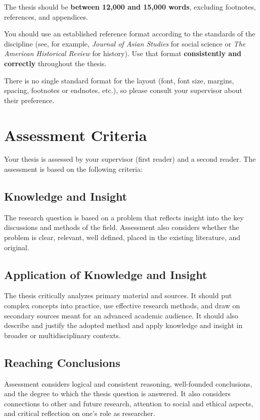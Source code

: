 \documentclass[11pt,a4paper]{article}
\begin{document}
The thesis should be \textbf{between 12,000 and 15,000 words}, excluding footnotes, references, and appendices.

You should use an established reference format according to the standards of the discipline (see, for example, \textit{Journal of Asian Studies} for social science or \textit{The American Historical Review} for history). Use that format \textbf{consistently and correctly} throughout the thesis.

There is no single standard format for the layout (font, font size, margins, spacing, footnotes or endnotes, etc.), so please consult your supervisor about their preference.

\section{Assessment Criteria}

Your thesis is assessed by your supervisor (first reader) and a second reader. The assessment is based on the following criteria:

\subsection{Knowledge and Insight}

The research question is based on a problem that reflects insight into the key discussions and methods of the field. Assessment also considers whether the problem is clear, relevant, well defined, placed in the existing literature, and original.

\subsection{Application of Knowledge and Insight}

The thesis critically analyzes primary material and sources. It should put complex concepts into practice, use effective research methods, and draw on secondary sources meant for an advanced academic audience. It should also describe and justify the adopted method and apply knowledge and insight in broader or multidisciplinary contexts.

\subsection{Reaching Conclusions}

Assessment considers logical and consistent reasoning, well-founded conclusions, and the degree to which the thesis question is answered. It also considers connections to other and future research, attention to social and ethical aspects, and critical reflection on one's role as researcher.
\end{document}

